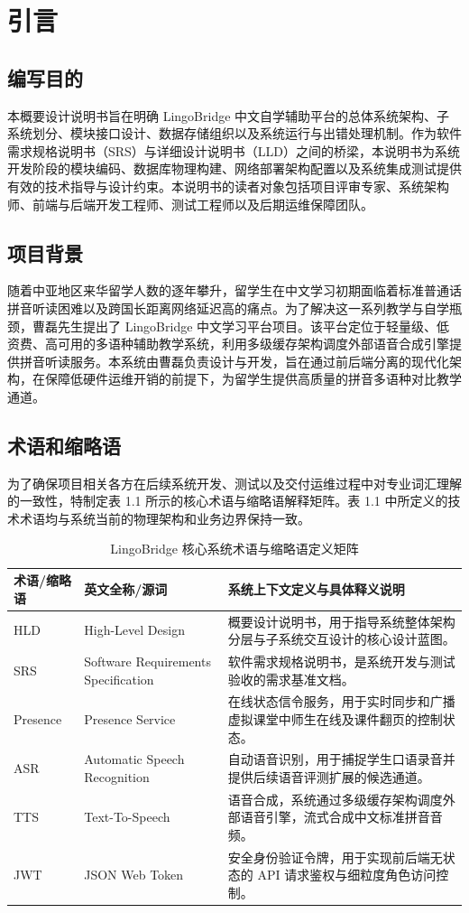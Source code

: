 \chapter{引言}

\section{编写目的}
本概要设计说明书旨在明确 LingoBridge 中文自学辅助平台的总体系统架构、子系统划分、模块接口设计、数据存储组织以及系统运行与出错处理机制。作为软件需求规格说明书（SRS）与详细设计说明书（LLD）之间的桥梁，本说明书为系统开发阶段的模块编码、数据库物理构建、网络部署架构配置以及系统集成测试提供有效的技术指导与设计约束。本说明书的读者对象包括项目评审专家、系统架构师、前端与后端开发工程师、测试工程师以及后期运维保障团队。

\section{项目背景}
随着中亚地区来华留学人数的逐年攀升，留学生在中文学习初期面临着标准普通话拼音听读困难以及跨国长距离网络延迟高的痛点。为了解决这一系列教学与自学瓶颈，曹磊先生提出了 LingoBridge 中文学习平台项目。该平台定位于轻量级、低资费、高可用的多语种辅助教学系统，利用多级缓存架构调度外部语音合成引擎提供拼音听读服务。本系统由曹磊负责设计与开发，旨在通过前后端分离的现代化架构，在保障低硬件运维开销的前提下，为留学生提供高质量的拼音多语种对比教学通道。

\section{术语和缩略语}
为了确保项目相关各方在后续系统开发、测试以及交付运维过程中对专业词汇理解的一致性，特制定表 1.1 所示的核心术语与缩略语解释矩阵。表 1.1 中所定义的技术术语均与系统当前的物理架构和业务边界保持一致。

\begin{table}[H]
\centering
\caption{LingoBridge 核心系统术语与缩略语定义矩阵}
\label{tab:glossary}
\begin{tabularx}{\textwidth}{l p{4.2cm} X}
\toprule
\textbf{术语/缩略语} & \textbf{英文全称/源词} & \textbf{系统上下文定义与具体释义说明} \\
\midrule
HLD & High-Level Design & 概要设计说明书，用于指导系统整体架构分层与子系统交互设计的核心设计蓝图。 \\
SRS & Software Requirements Specification & 软件需求规格说明书，是系统开发与测试验收的需求基准文档。 \\
Presence & Presence Service & 在线状态信令服务，用于实时同步和广播虚拟课堂中师生在线及课件翻页的控制状态。 \\
ASR & Automatic Speech Recognition & 自动语音识别，用于捕捉学生口语录音并提供后续语音评测扩展的候选通道。 \\
TTS & Text-To-Speech & 语音合成，系统通过多级缓存架构调度外部语音引擎，流式合成中文标准拼音音频。 \\
JWT & JSON Web Token & 安全身份验证令牌，用于实现前后端无状态的 API 请求鉴权与细粒度角色访问控制。 \\
\bottomrule
\end{tabularx}
\end{table}

